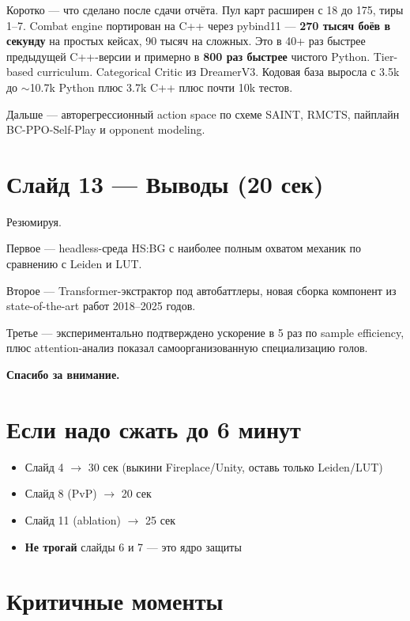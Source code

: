 \documentclass[a4paper,12pt]{extarticle}
\begin{document}
Коротко --- что сделано после сдачи отчёта. Пул карт расширен с 18 до 175, тиры 1--7. Combat engine портирован на C++ через pybind11 --- \textbf{270 тысяч боёв в секунду} на простых кейсах, 90 тысяч на сложных. Это в 40+ раз быстрее предыдущей C++-версии и примерно в \textbf{800 раз быстрее} чистого Python. Tier-based curriculum. Categorical Critic из DreamerV3. Кодовая база выросла с 3.5k до $\sim$10.7k Python плюс 3.7k C++ плюс почти 10k тестов.

Дальше --- авторегрессионный action space по схеме SAINT, RMCTS, пайплайн BC-PPO-Self-Play и opponent modeling.

\section*{Слайд 13 --- Выводы (20 сек)}

Резюмируя.

Первое --- headless-среда HS:BG с наиболее полным охватом механик по сравнению с Leiden и LUT.

Второе --- Transformer-экстрактор под автобаттлеры, новая сборка компонент из state-of-the-art работ 2018--2025 годов.

Третье --- экспериментально подтверждено ускорение в 5 раз по sample efficiency, плюс attention-анализ показал самоорганизованную специализацию голов.

\textbf{Спасибо за внимание.}

\hrulefill

\section*{Если надо сжать до 6 минут}

\begin{itemize}[noitemsep]
  \item Слайд 4 $\to$ 30 сек (выкини Fireplace/Unity, оставь только Leiden/LUT)
  \item Слайд 8 (PvP) $\to$ 20 сек
  \item Слайд 11 (ablation) $\to$ 25 сек
  \item \textbf{Не трогай} слайды 6 и 7 --- это ядро защиты
\end{itemize}

\section*{Критичные моменты}
\end{document}
